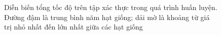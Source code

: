 \begin{figure}[htbp]
\centering
\resizebox{\textwidth}{!}{}
\caption[Diễn biến tổng tốc độ trên tập xác thực trong quá trình huấn luyện]{Diễn biến tổng tốc độ trên tập xác thực trong quá trình huấn luyện. Đường đậm là trung bình năm hạt giống; dải mờ là khoảng từ giá trị nhỏ nhất đến lớn nhất giữa các hạt giống}
\label{fig:ch4-duong-cong}
\end{figure}
